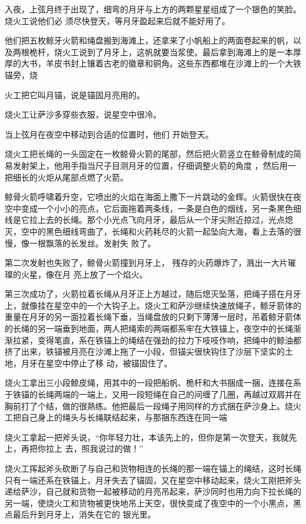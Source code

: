 \documentclass{article}
\begin{document}
入夜，上弦月终于出现了，细弯的月牙与上方的两颗星星组成了一个银色的笑脸。烧火工说他们必
须尽快登天，等月牙盈起来后就不能好用了。 

他们把五枚鲸牙火箭和绳盘搬到海滩上，还拿来了小帆船上的两面卷起来的帆，以及两根桅杆，烧火工说到了月牙上，这帆就要当浆使。最后拿到海滩上的是一本厚厚的大书，羊皮书封上镶着古老的徽章和铜角。这些东西都堆在沙滩上的一个大铁锚旁，烧

\newpage
火工把它叫月锚，说是锚固月亮用的。 


烧火工让萨沙多穿些衣服，说星空中很冷。 

当上弦月在夜空中移动到合适的位置时，他们
开始登天。 

烧火工把长绳的一头固定在一枚鲸骨火箭的尾部，然后把火箭竖立在鲸骨制成的简易发射架上，他用手指当尺子目测月牙的位置，仔细调整火箭的角度
，然后用一把细长的火炬从尾部点燃了火箭。 

鲸骨火箭呼啸着升空，它喷出的火焰在海面上撒下一片跳动的金辉。火箭很快在夜空中变成一个小小的亮点，它后面拖着两条线，一条是白色的烟线，另一条黑色细线是它拉上去的长绳。那个小光点飞向月牙，最后从一个牙尖附近掠过，光点熄灭，空中的黑色细线弯曲了，长绳和火药耗尽的火箭一起坠向大海，看上去落的很慢，像一根飘落的长发丝。发射失
败了。 

第二次发射也失败了，鲸骨火箭撞到月牙上，
\newpage
残存的火药爆炸了，溅出一大片璀璨的火星，像在月
亮上放了一个焰火。 

第三次成功了，火箭拉着长绳从月牙正上方越过，随后熄灭坠落，把绳子搭在月牙上，就像挂在星空中的一个大钩子上。烧火工和萨沙继续快速放绳子，鲸牙箭体的重量在月牙的另一面拉着长绳下垂，当绳盘放的只剩下薄薄一层时，吊着鲸牙箭体的长绳的另一端垂到地面，两人把绳索的两端都系牢在大铁锚上，夜空中的长绳渐渐拉紧，变得笔直，系在铁锚上的绳结在强劲的拉力下吱吱作响，把绳中的鲸油都挤了出来，铁锚被月亮在沙滩上拖了一小段，但锚尖很快钩住了沙层下坚实的土地，月牙在星空中停止了移
动，被锚固住了。 

烧火工拿出三小段鲸皮绳，用其中的一段把船帆、桅杆和大书捆成一捆，连接在系于铁锚的长绳两端的一端上，又用一段短绳在自己的间缠了几圈，再越过双肩并在胸前打了个结，做的很熟练。他把最后一段绳子用同样的方式捆在萨沙身上。烧火工把自己身上的绳头与长绳联结起来，与那捆东西连在同一端
\newpage


烧火工拿起一把斧头说，“你年轻力壮，本该先上的，但你是第一次登天，我就先上，再把你拉上
去，照我说过的做！” 

烧火工挥起斧头砍断了与自己和货物相连的长绳的那一端在锚上的绳结，这时长绳只有一端还系在铁锚上，月牙失去了锚固，又在星空中移动起来，烧火工刚把斧头递给萨沙，自己就和货物一起被移动的月亮吊起来，萨沙同时也用力向下拉长绳的另一端，使烧火工和货物被更快地吊上天空，很快变成了夜空中的一个小黑点，黑点最后升到月牙上，消失在它的
银光里。 
\end{document}
